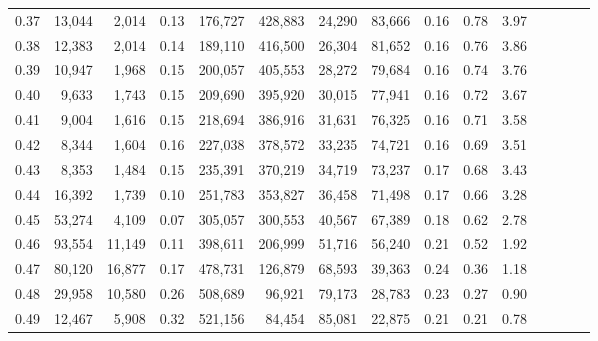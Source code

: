 \begin{tabular}{rrrcrrrrrrrrrrr}
0.37 &  13,044 &   2,014 &                                       0.13 &  176,727 &  428,883 &   24,290 &   83,666 &  0.16 &  0.78 &                         3.97 \\
0.38 &  12,383 &   2,014 &                                       0.14 &  189,110 &  416,500 &   26,304 &   81,652 &  0.16 &  0.76 &                         3.86 \\
0.39 &  10,947 &   1,968 &                                       0.15 &  200,057 &  405,553 &   28,272 &   79,684 &  0.16 &  0.74 &                         3.76 \\
0.40 &   9,633 &   1,743 &                                       0.15 &  209,690 &  395,920 &   30,015 &   77,941 &  0.16 &  0.72 &                         3.67 \\
0.41 &   9,004 &   1,616 &                                       0.15 &  218,694 &  386,916 &   31,631 &   76,325 &  0.16 &  0.71 &                         3.58 \\
0.42 &   8,344 &   1,604 &                                       0.16 &  227,038 &  378,572 &   33,235 &   74,721 &  0.16 &  0.69 &                         3.51 \\
0.43 &   8,353 &   1,484 &                                       0.15 &  235,391 &  370,219 &   34,719 &   73,237 &  0.17 &  0.68 &                         3.43 \\
0.44 &  16,392 &   1,739 &                                       0.10 &  251,783 &  353,827 &   36,458 &   71,498 &  0.17 &  0.66 &                         3.28 \\
0.45 &  53,274 &   4,109 &                                       0.07 &  305,057 &  300,553 &   40,567 &   67,389 &  0.18 &  0.62 &                         2.78 \\
0.46 &  93,554 &  11,149 &                                       0.11 &  398,611 &  206,999 &   51,716 &   56,240 &  0.21 &  0.52 &                         1.92 \\
0.47 &  80,120 &  16,877 &                                       0.17 &  478,731 &  126,879 &   68,593 &   39,363 &  0.24 &  0.36 &                         1.18 \\
0.48 &  29,958 &  10,580 &                                       0.26 &  508,689 &   96,921 &   79,173 &   28,783 &  0.23 &  0.27 &                         0.90 \\
0.49 &  12,467 &   5,908 &                                       0.32 &  521,156 &   84,454 &   85,081 &   22,875 &  0.21 &  0.21 &                         0.78 \\

\end{tabular}
